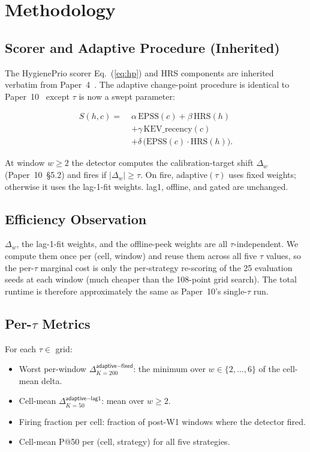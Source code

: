 \section{Methodology}

\subsection{Scorer and Adaptive Procedure (Inherited)}

The HygienePrio scorer Eq.~(\ref{eq:hp}) and HRS components are
inherited verbatim from Paper~4~\cite{paper4hygieneprio}. The adaptive
change-point procedure is identical to Paper~10~\cite{paper10adaptive}
except $\tau$ is now a swept parameter:

\begin{equation}
\begin{aligned}
S(h,c) =\;& \alpha\,\mathrm{EPSS}(c) + \beta\,\mathrm{HRS}(h) \\
          & + \gamma\,\mathrm{KEV\_recency}(c) \\
          & + \delta\,\bigl(\mathrm{EPSS}(c) \cdot \mathrm{HRS}(h)\bigr).
\end{aligned}
\label{eq:hp}
\end{equation}

At window $w \geq 2$ the detector computes the calibration-target
shift $\Delta_w$ (Paper~10~\S5.2) and fires if $|\Delta_w| \geq \tau$.
On fire, \textsf{adaptive}$(\tau)$ uses \textsf{fixed} weights;
otherwise it uses the lag-1-fit weights. \textsf{lag1},
\textsf{offline}, and \textsf{gated} are unchanged.

\subsection{Efficiency Observation}

$\Delta_w$, the lag-1-fit weights, and the offline-peek weights are
all $\tau$-independent. We compute them once per (cell, window) and
reuse them across all five $\tau$ values, so the per-$\tau$ marginal
cost is only the per-strategy re-scoring of the 25 evaluation seeds
at each window (much cheaper than the 108-point grid search).
The total runtime is therefore approximately the same as Paper~10's
single-$\tau$ run.

\subsection{Per-$\tau$ Metrics}

For each $\tau \in$ grid:
\begin{itemize}
\item Worst per-window $\Delta^{\textsf{adaptive}-\textsf{fixed}}_{K=200}$:
the minimum over $w \in \{2, \ldots, 6\}$ of the cell-mean delta.
\item Cell-mean $\Delta^{\textsf{adaptive}-\textsf{lag1}}_{K=50}$:
mean over $w \geq 2$.
\item Firing fraction per cell: fraction of post-W1 windows where
the detector fired.
\item Cell-mean P@50 per (cell, strategy) for all five strategies.
\end{itemize}
